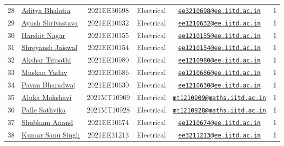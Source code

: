 \documentclass[table]{rapportCS}
\begin{document}
\begin{table}[h]
\begin{tabular}{|p{.3cm}|p{2.9cm}|c|p{2cm}|c|p{.3cm}|}
        28 & \href{https://www.linkedin.com/in/aditya-bhalotia-756654253}{Aditya Bhalotia} & 2021EE30698 & Electrical & \href{mailto:ee3210698@ee.iitd.ac.in}{\nolinkurl{ee3210698@ee.iitd.ac.in}} & 1 \\
        29 & \href{https://www.linkedin.com/in/ayush-shrivastava-264398248}{Ayush Shrivastava} & 2021EE10632 & Electrical & \href{mailto:ee1210632@ee.iitd.ac.in}{\nolinkurl{ee1210632@ee.iitd.ac.in}} & 1 \\
        30 & \href{https://www.linkedin.com/in/harshit-nagar-178a33253}{Harshit Nagar} & 2021EE10155 & Electrical & \href{mailto:ee1210155@ee.iitd.ac.in}{\nolinkurl{ee1210155@ee.iitd.ac.in}} & 1 \\
        
        31 & \href{www.linkedin.com/in/shreyansh-jaiswal-4b79b2228}{Shreyansh Jaiswal} & 2021EE10154 & Electrical & \href{mailto:ee1210154@ee.iitd.ac.in}{\nolinkurl{ee1210154@ee.iitd.ac.in}} & 1 \\
        32 & \href{https://www.linkedin.com/in/akshar-tripathi-9a267425b/}{Akshar Tripathi} & 2021EE10980 & Electrical & \href{mailto:ee1210980@ee.iitd.ac.in}{\nolinkurl{ee1210980@ee.iitd.ac.in}} & 1 \\
        33 & \href{https://www.linkedin.com/in/muskan-yadav-2b0651b4}{Muskan Yadav} & 2021EE10686 & Electrical & \href{mailto:ee1210686@ee.iitd.ac.in}{\nolinkurl{ee1210686@ee.iitd.ac.in}} & 1 \\
        34 & \href{https://www.linkedin.com/in/pavan-bharadwaj-07025a281/}{Pavan Bharadwaj} & 2021EE10630 & Electrical & \href{mailto:ee1210630@ee.iitd.ac.in}{\nolinkurl{ee1210630@ee.iitd.ac.in}} & 1 \\
        35 & \href{https://www.linkedin.com/in/mokshavi-reddy-93b41a255}{Aluka Mokshavi} & 2021MT10909 & Electrical & \href{mailto:mt1210909@maths.iitd.ac.in}{\nolinkurl{mt1210909@maths.iitd.ac.in}} & 1 \\
        36 & \href{https://www.linkedin.com/in/sathvika-palle-28a13025a}{Palle Sathvika} & 2021MT10928 & Electrical & \href{mailto:mt1210928@maths.iitd.ac.in}{\nolinkurl{mt1210928@maths.iitd.ac.in}} & 1 \\
        37 & \href{www.linkedin.com/in/shubham-anand-055423252}{Shubham Anand} & 2021EE10674 & Electrical & \href{mailto:ee1210674@ee.iitd.ac.in}{\nolinkurl{ee1210674@ee.iitd.ac.in}} & 1 \\
        38 & \href{https://www.linkedin.com/in/sanu-a5b6a72ab/}{Kumar Sanu Singh }& 2021EE31213 & Electrical & \href{mailto:ee3211213@ee.iitd.ac.in}{\nolinkurl{ee3211213@ee.iitd.ac.in}} & 1 \\

\end{tabular}
\end{table}
\end{document}

